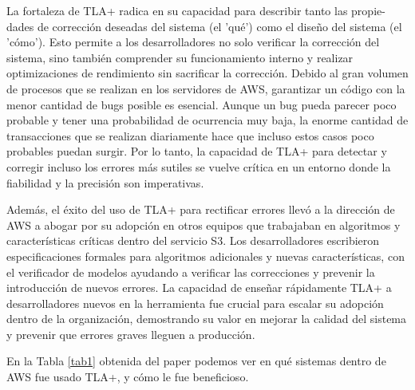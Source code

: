 \documentclass[runningheads]{llncs}
\begin{document}
La fortaleza de TLA+ radica en su capacidad para describir tanto las propie-\\dades de corrección deseadas del sistema (el 'qué') como el diseño del sistema (el 'cómo'). Esto permite a los desarrolladores no solo verificar la corrección del sistema, sino también comprender su funcionamiento interno y realizar optimizaciones de rendimiento sin sacrificar la corrección. Debido al gran volumen de procesos que se realizan en los servidores de AWS, garantizar un código con la menor cantidad de bugs posible es esencial. Aunque un bug pueda parecer poco probable y tener una probabilidad de ocurrencia muy baja, la enorme cantidad de transacciones que se realizan diariamente hace que incluso estos casos poco probables puedan surgir. Por lo tanto, la capacidad de TLA+ para detectar y corregir incluso los errores más sutiles se vuelve crítica en un entorno donde la fiabilidad y la precisión son imperativas.

Además, el éxito del uso de TLA+ para rectificar errores llevó a la dirección de AWS a abogar por su adopción en otros equipos que trabajaban en algoritmos y características críticas dentro del servicio S3. Los desarrolladores escribieron especificaciones formales para algoritmos adicionales y nuevas características, con el verificador de modelos ayudando a verificar las correcciones y prevenir la introducción de nuevos errores. La capacidad de enseñar rápidamente TLA+ a desarrolladores nuevos en la herramienta fue crucial para escalar su adopción dentro de la organización, demostrando su valor en mejorar la calidad del sistema y prevenir que errores graves lleguen a producción.

En la Tabla \ref{tab1} obtenida del paper podemos ver en qué sistemas dentro de AWS fue usado TLA+, y cómo le fue beneficioso.
\end{document}
